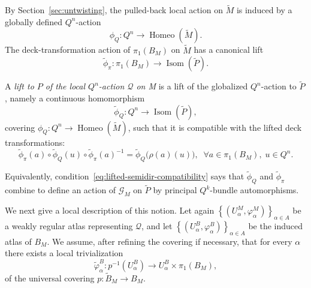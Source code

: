 \documentclass[11pt,a4paper]{article}
\numberwithin{equation}{section}
\theoremstyle{named}
\begin{document}
By Section~\ref{sec:untwisting}, the pulled-back local action on \(\widetilde M\) is induced by a globally defined \(Q^n\)-action
\[
\phi_Q:Q^n\longrightarrow\operatorname{Homeo}(\widetilde M).
\]
The deck-transformation action of \(\pi_1(B_M)\) on \(\widetilde M\) has a canonical lift
\[
\widetilde\phi_\pi:\pi_1(B_M)\longrightarrow\operatorname{Isom}(\widetilde P).
\]

\begin{definition}
\label{def:local-Q-lifting}
A \emph{lift to $P$ of the local \(Q^n\)-action \(\mathcal Q\) on M} is a lift of the globalized \(Q^n\)-action to \(\widetilde P\), namely a continuous
homomorphism
\[
\widetilde\phi_Q:
Q^n\longrightarrow
\operatorname{Isom}(\widetilde P),
\]
covering $\phi_Q:Q^n\longrightarrow\operatorname{Homeo}(\widetilde M)$,
such that it is compatible with the lifted deck transformations:
\begin{equation}
\label{eq:lifted-semidir-compatibility}
\widetilde\phi_\pi(a)\circ
\widetilde\phi_Q(u)\circ
\widetilde\phi_\pi(a)^{-1}
=
\widetilde\phi_Q\bigl(\rho(a)(u)\bigr),\;\;\forall a\in\pi_1(B_M),\;u\in Q^n.
\end{equation}
\end{definition}

\noindent Equivalently, condition~\eqref{eq:lifted-semidir-compatibility} says that \(\widetilde\phi_Q\) and \(\widetilde\phi_\pi\) combine to define an action of 
$\mathcal G_M$
on \(\widetilde P\) by principal \(Q^k\)-bundle automorphisms.

\noindent We next give a local description of this notion. Let again $\left\{
(U_\alpha^M,\varphi_\alpha^M)
\right\}_{\alpha\in A}$
be a weakly regular atlas representing \(\mathcal Q\), and let $\left\{
(U_\alpha^B,\varphi_\alpha^B)
\right\}_{\alpha\in A}$
be the induced atlas of \(B_M\). We assume, after refining the covering if necessary, that for every \(\alpha\) there exists a local trivialization
\[
\widetilde\varphi_\alpha^B:
p^{-1}(U_\alpha^B)
\longrightarrow
U_\alpha^B\times\pi_1(B_M),
\]
of the universal covering  $p:\widetilde B_M\longrightarrow B_M.$
\end{document}
